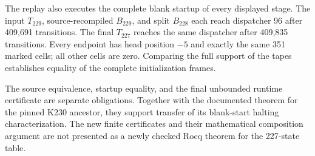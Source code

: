 The replay also executes the complete blank startup of every displayed
stage.  The input $T_{229}$, source-recompiled $B_{229}$, and split
$B_{228}$ each reach dispatcher 96 after 409,691 transitions.  The final
$T_{227}$ reaches the same dispatcher after 409,835 transitions.  Every
endpoint has head position $-5$ and exactly the same 351 marked cells;
all other cells are zero.  Comparing the full support of the tapes
establishes equality of the complete initialization frames.

The source equivalence, startup equality, and the final unbounded runtime
certificate are separate obligations.  Together with the documented
theorem for the pinned K230 ancestor, they support transfer of its
blank-start halting characterization.  The new finite certificates and
their mathematical composition argument are not presented as a newly
checked Rocq theorem for the 227-state table.
